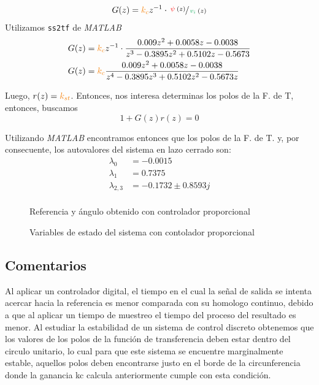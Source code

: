 \begin{align}
  G(z) &= \nara{k_{c}}z^{-1} \cdot \sfrac{\rojo{\psi}(z)}{\verd{v_{i}}(z)} \\
\end{align}
Utilizamos \verb|ss2tf| de \textit{MATLAB} 
\begin{align}
  G(z) &= \nara{k_{c}}z^{-1} \cdot \frac{0.009z^{2} + 0.0058z - 0.0038}{z^{3} - 0.3895z^{2} + 0.5102z - 0.5673} \\
  G(z) &= \nara{k_{c}}\frac{0.009z^{2} + 0.0058z - 0.0038}{z^{4} - 0.3895z^{3} + 0.5102z^{2} - 0.5673z}
\end{align}

Luego, $r(z) = \nara{k_{st}}$. Entonces, nos interesa determinas los polos de
la F. de T, entonces, buscamos
\begin{equation}
  1 + G(z)r(z) = 0
\end{equation}

Utilizando \textit{MATLAB} encontramos entonces que los polos de la F. de T. y,
por consecuente, los autovalores del sistema en lazo cerrado son:
\begin{align}
  \lambda_{0} &= -0.0015 \\
  \lambda_{1} &= 0.7375 \\
  \lambda_{2,3} &= -0.1732 \pm 0.8593j \\
\end{align}

\begin{figure}[h]
  \centering
  
  \caption{Referencia y ángulo obtenido con controlador proporcional}\label{fig:psi-prop-disc}
\end{figure}

\begin{figure}[h]
  \centering
  
  \caption{Variables de estado del sistema con contolador proporcional}\label{fig:estado-prop-disc}
\end{figure}


\FloatBarrier


\subsection{Comentarios}

Al aplicar un controlador digital, el tiempo en el cual la señal de salida se intenta acercar 
hacia la referencia es menor comparada con su homologo continuo, debido a que al aplicar 
un tiempo de muestreo el tiempo del proceso del resultado es menor. 
Al estudiar la estabilidad de un sistema de control discreto obtenemos que los valores de los 
polos de la función de transferencia deben estar dentro del circulo unitario, lo cual para que 
este sistema se encuentre marginalmente estable, aquellos polos deben encontrarse justo en el 
borde de la circunferencia donde la ganancia kc calcula anteriormente cumple con esta 
condición.
